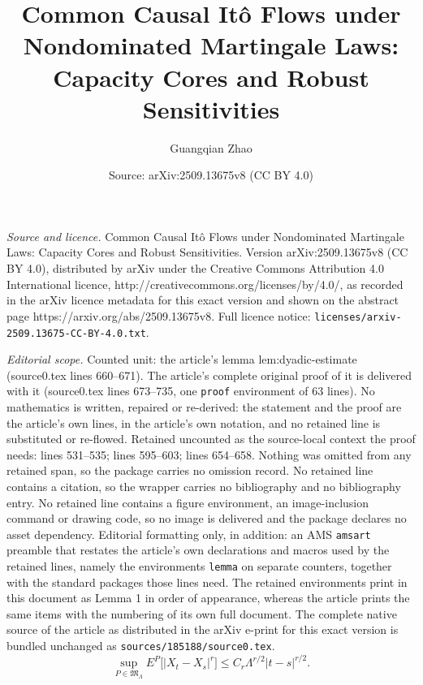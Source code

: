 \documentclass[10pt,a4paper]{amsart}
\title{Common Causal It\^o Flows under Nondominated Martingale Laws: Capacity Cores and Robust Sensitivities}
\author{Guangqian Zhao}
\date{Source: arXiv:2509.13675v8 (CC BY 4.0)}
\newcommand{\abs}[1]{\left\lvert #1\right\rvert}
\begin{document}
\maketitle

\noindent\emph{Source and licence.} Common Causal It\^o Flows under Nondominated Martingale Laws: Capacity Cores and Robust Sensitivities. Version arXiv:2509.13675v8 (CC BY 4.0), distributed by arXiv under the Creative Commons Attribution 4.0 International licence, http://creativecommons.org/licenses/by/4.0/, as recorded in the arXiv licence metadata for this exact version and shown on the abstract page https://arxiv.org/abs/2509.13675v8. Full licence notice: \texttt{licenses/arxiv-2509.13675-CC-BY-4.0.txt}.\par\smallskip

\noindent\textit{Editorial scope.} Counted unit: the article's lemma lem:dyadic-estimate (source0.tex lines 660--671). The article's complete original proof of it is delivered with it (source0.tex lines 673--735, one \texttt{proof} environment of 63 lines). No mathematics is written, repaired or re-derived: the statement and the proof are the article's own lines, in the article's own notation, and no retained line is substituted or re-flowed.  Retained uncounted as the source-local context the proof needs: lines 531--535; lines 595--603; lines 654--658.  Nothing was omitted from any retained span, so the package carries no omission record.  No retained line contains a citation, so the wrapper carries no bibliography and no bibliography entry.  No retained line contains a figure environment, an image-inclusion command or drawing code, so no image is delivered and the package declares no asset dependency.  Editorial formatting only, in addition: an AMS \texttt{amsart} preamble that restates the article's own declarations and macros used by the retained lines, namely the environments \texttt{lemma} on separate counters, together with the standard packages those lines need.  The retained environments print in this document as Lemma 1 in order of appearance, whereas the article prints the same items with the numbering of its own full document.  The complete native source of the article as distributed in the arXiv e-print for this exact version is bundled unchanged as \texttt{sources/185188/source0.tex}.
\begin{equation}\label{eq:martingale-moment}
  \sup_{P\in\mathfrak M_\Lambda}
  E^P\bigl[\abs{X_t-X_s}^r\bigr]
  \le C_r\Lambda^{r/2}\abs{t-s}^{r/2}.
\end{equation}
\end{document}

